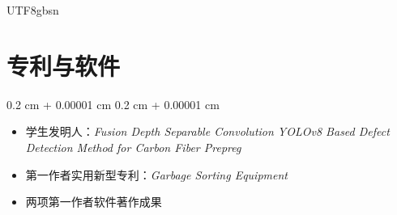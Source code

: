 \documentclass[10pt, letterpaper]{article}
\newenvironment{highlights}{
    \begin{itemize}[
        topsep=0.10 cm,
        parsep=0.10 cm,
        partopsep=0pt,
        itemsep=0pt,
        leftmargin=0.4 cm + 10pt
    ]
}{
    \end{itemize}
} %
\newenvironment{onecolentry}{
    \begin{adjustwidth}{
        0.2 cm + 0.00001 cm
    }{
        0.2 cm + 0.00001 cm
    }
}{
    \end{adjustwidth}
} %
\begin{document}
\begin{CJK*}{UTF8}{gbsn}
\section{专利与软件}

\begin{onecolentry}
    \begin{highlights}
        \item 学生发明人：\textit{Fusion Depth Separable Convolution YOLOv8 Based Defect Detection Method for Carbon Fiber Prepreg}
        \item 第一作者实用新型专利：\textit{Garbage Sorting Equipment}
        \item 两项第一作者软件著作成果
    \end{highlights}
\end{onecolentry}

\end{CJK*}
\end{document}
